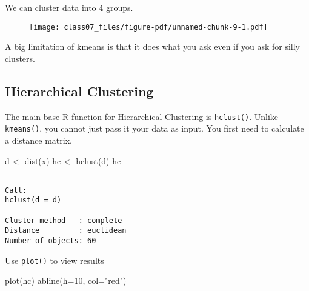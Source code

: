 \documentclass[
  letterpaper,
  DIV=11,
  numbers=noendperiod]{scrartcl}
\newenvironment{Shaded}{\begin{snugshade}}{\end{snugshade}}
\newcommand{\AttributeTok}[1]{\textcolor[rgb]{0.40,0.45,0.13}{#1}}
\newcommand{\CommentTok}[1]{\textcolor[rgb]{0.37,0.37,0.37}{#1}}
\newcommand{\DecValTok}[1]{\textcolor[rgb]{0.68,0.00,0.00}{#1}}
\newcommand{\FunctionTok}[1]{\textcolor[rgb]{0.28,0.35,0.67}{#1}}
\newcommand{\NormalTok}[1]{\textcolor[rgb]{0.00,0.23,0.31}{#1}}
\newcommand{\OtherTok}[1]{\textcolor[rgb]{0.00,0.23,0.31}{#1}}
\newcommand{\SpecialCharTok}[1]{\textcolor[rgb]{0.37,0.37,0.37}{#1}}
\newcommand{\StringTok}[1]{\textcolor[rgb]{0.13,0.47,0.30}{#1}}
\begin{document}
We can cluster data into 4 groups.

\begin{Shaded}
\end{Shaded}

\begin{figure}[H]

{\centering \texttt{[image: class07\_files/figure-pdf/unnamed-chunk-9-1.pdf]}

}

\end{figure}

A big limitation of kmeans is that it does what you ask even if you ask
for silly clusters.

\hypertarget{hierarchical-clustering}{%
\subsection{Hierarchical Clustering}\label{hierarchical-clustering}}

The main base R function for Hierarchical Clustering is
\texttt{hclust()}. Unlike \texttt{kmeans()}, you cannot just pass it
your data as input. You first need to calculate a distance matrix.

\begin{Shaded}
\begin{Highlighting}[]
\NormalTok{d }\OtherTok{\textless{}{-}} \FunctionTok{dist}\NormalTok{(x)}
\NormalTok{hc }\OtherTok{\textless{}{-}} \FunctionTok{hclust}\NormalTok{(d)}
\NormalTok{hc}
\end{Highlighting}
\end{Shaded}

\begin{verbatim}

Call:
hclust(d = d)

Cluster method   : complete 
Distance         : euclidean 
Number of objects: 60 
\end{verbatim}

Use \texttt{plot()} to view results

\begin{Shaded}
\begin{Highlighting}[]
\FunctionTok{plot}\NormalTok{(hc)}
\FunctionTok{abline}\NormalTok{(}\AttributeTok{h=}\DecValTok{10}\NormalTok{, }\AttributeTok{col=}\StringTok{"red"}\NormalTok{)}
\end{Highlighting}
\end{Shaded}
\end{document}
